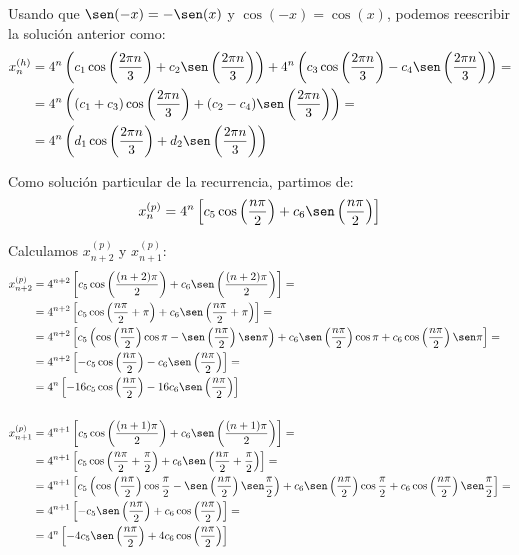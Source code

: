 \begin{ejercicio}
    Usando que $\sen(-x) = -\sen(x)$ y $\cos(-x) = \cos(x)$, podemos reescribir la solución anterior como:
    \begin{align*}
        x_n^{(h)} &= 4^n\left(c_1\cos\left(\frac{2\pi n}{3}\right) + c_2\sen\left(\frac{2\pi n}{3}\right)\right)
        + 4^n\left(c_3\cos\left(\frac{2\pi n}{3}\right) - c_4\sen\left(\frac{2\pi n}{3}\right)\right) =\\
        &= 4^n\left((c_1+c_3)\cos\left(\frac{2\pi n}{3}\right) + (c_2-c_4)\sen\left(\frac{2\pi n}{3}\right)\right) =\\
        &= 4^n\left(d_1\cos\left(\frac{2\pi n}{3}\right) + d_2\sen\left(\frac{2\pi n}{3}\right)\right)
    \end{align*}

    Como solución particular de la recurrencia, partimos de:
    \begin{equation*}
        x_n^{(p)} = 4^n\left[c_5\cos\left(\frac{n\pi}{2}\right) + c_6\sen\left(\frac{n\pi}{2}\right)\right]
    \end{equation*}

    Calculamos $x_{n+2}^{(p)}$ y $x_{n+1}^{(p)}$:
    \begin{align*}
        x_{n+2}^{(p)} &= 4^{n+2}\left[c_5\cos\left(\frac{(n+2)\pi}{2}\right) + c_6\sen\left(\frac{(n+2)\pi}{2}\right)\right] =\\
        &= 4^{n+2}\left[c_5\cos\left(\frac{n\pi}{2} + \pi\right) + c_6\sen\left(\frac{n\pi}{2} + \pi\right)\right] =\\
        &= 4^{n+2}\left[c_5\left(\cos\left(\frac{n\pi}{2}\right)\cos\pi-\sen\left(\frac{n\pi}{2}\right)\sen\pi\right)
        + c_6\sen\left(\frac{n\pi}{2}\right)\cos\pi + c_6\cos\left(\frac{n\pi}{2}\right)\sen\pi\right] =\\
        &= 4^{n+2}\left[-c_5\cos\left(\frac{n\pi}{2}\right) - c_6\sen\left(\frac{n\pi}{2}\right)\right] =\\
        &= 4^n\left[-16c_5\cos\left(\frac{n\pi}{2}\right) - 16c_6\sen\left(\frac{n\pi}{2}\right)\right]
        \\ &\\
        x_{n+1}^{(p)} &= 4^{n+1}\left[c_5\cos\left(\frac{(n+1)\pi}{2}\right) + c_6\sen\left(\frac{(n+1)\pi}{2}\right)\right] =\\
        &= 4^{n+1}\left[c_5\cos\left(\frac{n\pi}{2} + \frac{\pi}{2}\right) + c_6\sen\left(\frac{n\pi}{2} + \frac{\pi}{2}\right)\right] =\\
        &= 4^{n+1}\left[c_5\left(\cos\left(\frac{n\pi}{2}\right)\cos\frac{\pi}{2}-\sen\left(\frac{n\pi}{2}\right)\sen\frac{\pi}{2}\right)
        + c_6\sen\left(\frac{n\pi}{2}\right)\cos\frac{\pi}{2} + c_6\cos\left(\frac{n\pi}{2}\right)\sen\frac{\pi}{2}\right] =\\
        &= 4^{n+1}\left[-c_5\sen\left(\frac{n\pi}{2}\right) + c_6\cos\left(\frac{n\pi}{2}\right)\right] =\\
        &= 4^n\left[-4c_5\sen\left(\frac{n\pi}{2}\right) + 4c_6\cos\left(\frac{n\pi}{2}\right)\right]
    \end{align*}


\end{ejercicio}
